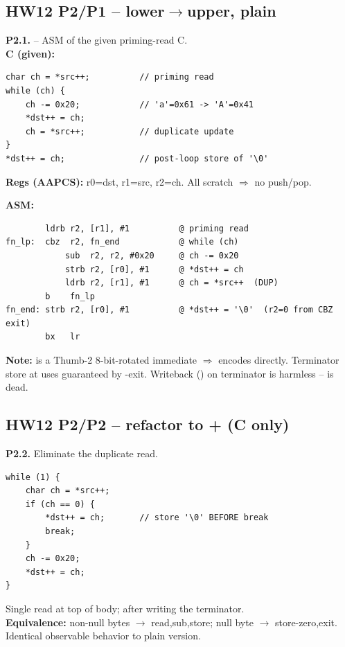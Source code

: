 \subsection{HW12 P2/P1 -- lower$\to$upper, plain }
\begin{hwp}\textbf{P2.1.}  -- ASM of the given priming-read C.\\
\textbf{C (given):}
\begin{lstlisting}
char ch = *src++;          // priming read
while (ch) {
    ch -= 0x20;            // 'a'=0x61 -> 'A'=0x41
    *dst++ = ch;
    ch = *src++;           // duplicate update
}
*dst++ = ch;               // post-loop store of '\0'
\end{lstlisting}

\textbf{Regs (AAPCS):} r0=dst, r1=src, r2=ch. All scratch $\Rightarrow$ no push/pop.

\textbf{ASM:}
\begin{lstlisting}
        ldrb r2, [r1], #1          @ priming read
fn_lp:  cbz  r2, fn_end            @ while (ch)
            sub  r2, r2, #0x20     @ ch -= 0x20
            strb r2, [r0], #1      @ *dst++ = ch
            ldrb r2, [r1], #1      @ ch = *src++  (DUP)
        b    fn_lp
fn_end: strb r2, [r0], #1          @ *dst++ = '\0'  (r2=0 from CBZ exit)
        bx   lr
\end{lstlisting}
\textbf{Note:}  is a Thumb-2 8-bit-rotated immediate $\Rightarrow$  encodes directly. Terminator store at  uses  guaranteed by -exit. Writeback () on terminator  is harmless --  is dead.
\end{hwp}

\subsection{HW12 P2/P2 -- refactor to + (C only)}
\begin{hwp}\textbf{P2.2.} Eliminate the duplicate  read.
\begin{lstlisting}
while (1) {
    char ch = *src++;
    if (ch == 0) {
        *dst++ = ch;       // store '\0' BEFORE break
        break;
    }
    ch -= 0x20;
    *dst++ = ch;
}
\end{lstlisting}
Single read at top of body;  after writing the terminator.\\
\textbf{Equivalence:} non-null bytes $\to$ read,sub,store; null byte $\to$ store-zero,exit. Identical observable behavior to plain  version.
\end{hwp}

